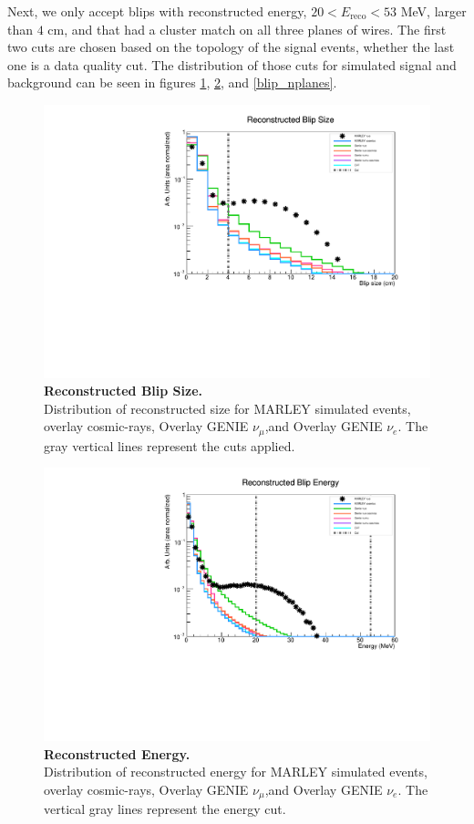 Next, we only accept blips with reconstructed energy, $20 < E_\text{reco} < 53$ MeV, larger than $4$ cm, and that had a cluster match on all three planes of wires. The first two cuts are chosen based on the topology of the signal events, whether the last one is a data quality cut.
The distribution of those cuts for simulated signal and background can be seen in figures \ref{blip_size}, \ref{blip_energy}, and \ref{blip_nplanes}.

\begin{figure}[h!]
    \centering
    \includegraphics[width=120mm]{Figures/blip_size.pdf}
    \caption[Reconstructed Blip Size.]{{\textbf{Reconstructed Blip Size.}}\\ Distribution of reconstructed size for MARLEY simulated events, overlay cosmic-rays, Overlay GENIE $\nu_{\mu}$,and Overlay GENIE $\nu_{e}$. The gray vertical lines represent the cuts applied.}
 \label{blip_size}
\end{figure}

\begin{figure}[h!]
    \centering
    \includegraphics[width=120mm]{Figures/Energy_MC.pdf}
    \caption[Reconstructed Energy.]{{\textbf{Reconstructed Energy.}}\\ Distribution of reconstructed energy for MARLEY simulated events, overlay cosmic-rays, Overlay GENIE $\nu_{\mu}$,and Overlay GENIE $\nu_{e}$. The vertical gray lines represent the energy cut.}
 \label{blip_energy}
\end{figure}

